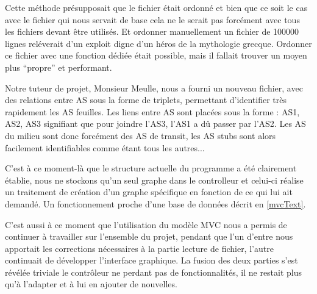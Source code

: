 Cette méthode présupposait que le fichier était ordonné et bien que ce soit le cas avec le fichier qui nous servait de base cela ne le serait pas forcément avec tous les fichiers devant être utilisés. Et ordonner manuellement un fichier de 100000 lignes reléverait d'un exploit digne d'un héros de la mythologie grecque. Ordonner ce fichier avec une fonction dédiée était possible, mais il fallait trouver un moyen plus ``propre'' et performant.

\par Notre tuteur de projet, Monsieur Meulle, nous a fourni un nouveau fichier, avec des relations entre AS sous la forme de triplets, permettant d'identifier tr\`es rapidement les AS feuilles.
Les liens entre AS sont plac\'ees sous la forme : {AS1, AS2, AS3} signifiant que pour joindre l'AS3, l'AS1 a dû passer par l'AS2. Les AS du milieu sont donc forcément des AS de transit, les AS stubs sont alors facilement identifiables comme \'etant tous les autres... 

C'est à ce moment-là que le structure actuelle du programme a été clairement établie, nous ne stockons qu'un seul graphe dans le controlleur et celui-ci réalise un traitement de création d'un graphe spécifique en fonction de ce qui lui ait demandé. Un fonctionnement proche d'une base de données décrit en \ref{mvcText}. 

C'est aussi à ce moment que l'utilisation du modèle MVC nous a permis de continuer à travailler sur l'ensemble du projet, pendant que l'un d'entre nous apportait les corrections nécessaires à la partie lecture de fichier, l'autre continuait de développer l'interface graphique. La fusion des deux parties s'est révélée triviale le contrôleur ne perdant pas de fonctionnalités, il ne restait plus qu'à l'adapter et à lui en ajouter de nouvelles.

